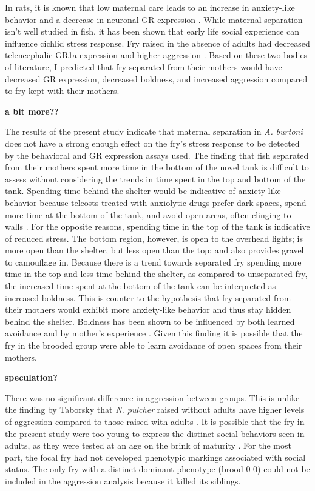 \documentclass[12pt,twoside]{reedthesis}
\begin{document}
In rats, it is known that low
maternal care leads to an increase in anxiety-like behavior and a decrease
in neuronal GR expression \citep{caldji_maternal_1998}. While maternal
separation isn't well studied in fish, it has been shown that early life
social experience can influence cichlid stress response. Fry raised in the
absence of adults had decreased telencephalic GR1a expression and higher
aggression \citep{nyman_effect_2017, arnold_social_2010}.  Based on these two bodies of literature, I predicted
that fry separated from their mothers would have decreased GR expression,
decreased boldness, and increased aggression compared to fry kept with their mothers. 

\textbf{a bit more??}

The results of the present study indicate that maternal separation in \textit{A.
burtoni} does not have a strong enough effect on the fry's stress response to be
detected by the behavioral and GR expression assays used. The finding that fish separated from their mothers spent more time in the bottom of the novel
tank is difficult to assess without considering the trends in time spent in the
top and bottom of the tank. Spending time behind the shelter would be
indicative of anxiety-like behavior because teleosts treated with anxiolytic
drugs prefer dark spaces, spend more time at the bottom of the tank, and avoid
open areas, often clinging to walls \citep{Gould2011, neumeister_socially_2017,
  ansai_chronic_2016, norton_three-spined_2019, ghisleni_role_2012}. For the opposite reasons, spending time in the top of the
tank is indicative of reduced stress. The bottom region, however, is open to the
overhead lights; is more open than the shelter, but less open than the top; and also provides gravel to
camouflage in. Because there is a trend towards separated fry spending more time in the top
and less time behind the shelter, as compared to unseparated fry, the increased
time spent at the bottom of the tank can be interpreted as increased 
boldness. This is counter to the hypothesis that
fry separated from their mothers would exhibit more anxiety-like behavior and
thus stay hidden behind the shelter. Boldness has been shown to be influenced by
both learned avoidance and by mother's experience \citep{brown_heritable_2007}.
Given this finding it is possible that the fry in
the brooded group were able to learn avoidance of open spaces from their mothers. 

\textbf{speculation?}

There was no significant difference in aggression between groups. This is unlike the
finding by Taborsky that \textit{N. pulcher} raised without adults have higher levels of
aggression compared to those raised with adults \citep{arnold_social_2010}. It
is possible that the fry in the present study were too young to express the
distinct social behaviors seen in adults, as they were tested at an age on the
brink of maturity \citep{fernald_quantitative_1977}. For the most part, the focal fry had not developed
phenotypic markings associated with social status. The only fry with a distinct
dominant phenotype (brood 0-0) could not be included in
the aggression analysis because it killed its siblings.
\end{document}
